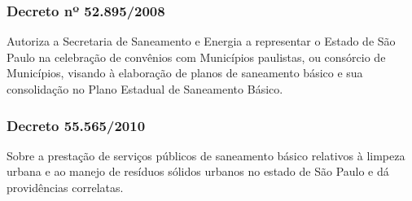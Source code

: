 \begin{subapend}
\begin{subsubapend}
		\subsubsection{Decreto nº 52.895/2008}
		Autoriza a Secretaria de Saneamento e Energia a representar o Estado de São Paulo na celebração de convênios com Municípios paulistas, ou consórcio de Municípios, visando à elaboração de planos de saneamento básico e sua consolidação no Plano Estadual de Saneamento Básico.
		\subsubsection{Decreto 55.565/2010}
		Sobre a prestação de serviços públicos de saneamento básico relativos à limpeza urbana e ao manejo de resíduos sólidos urbanos no estado de São Paulo e dá providências correlatas.
	\end{subsubapend}
\end{subapend}

